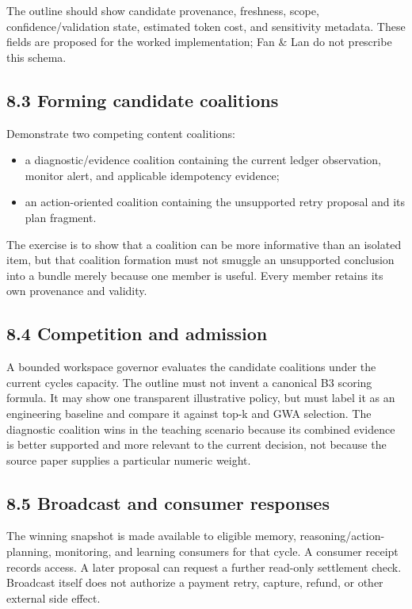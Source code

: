 The outline should show candidate provenance, freshness, scope, confidence/validation state, estimated token cost, and sensitivity metadata. These fields are proposed for the worked implementation; Fan \& Lan do not prescribe this schema.

\subsection{8.3 Forming candidate coalitions}\label{83-forming-candidate-coalitions}

Demonstrate two competing content coalitions:

\begin{itemize}
\tightlist
\item
  a diagnostic/evidence coalition containing the current ledger observation, monitor alert, and applicable idempotency evidence;
\item
  an action-oriented coalition containing the unsupported retry proposal and its plan fragment.
\end{itemize}

The exercise is to show that a coalition can be more informative than an isolated item, but that coalition formation must not smuggle an unsupported conclusion into a bundle merely because one member is useful. Every member retains its own provenance and validity.

\subsection{8.4 Competition and admission}\label{84-competition-and-admission}

A bounded workspace governor evaluates the candidate coalitions under the current cycle\textquotesingle s capacity. The outline must not invent a canonical B3 scoring formula. It may show one transparent illustrative policy, but must label it as an engineering baseline and compare it against top-k and GWA selection. The diagnostic coalition wins in the teaching scenario because its combined evidence is better supported and more relevant to the current decision, not because the source paper supplies a particular numeric weight.

\subsection{8.5 Broadcast and consumer responses}\label{85-broadcast-and-consumer-responses}

The winning snapshot is made available to eligible memory, reasoning/action-planning, monitoring, and learning consumers for that cycle. A consumer receipt records access. A later proposal can request a further read-only settlement check. Broadcast itself does not authorize a payment retry, capture, refund, or other external side effect.

